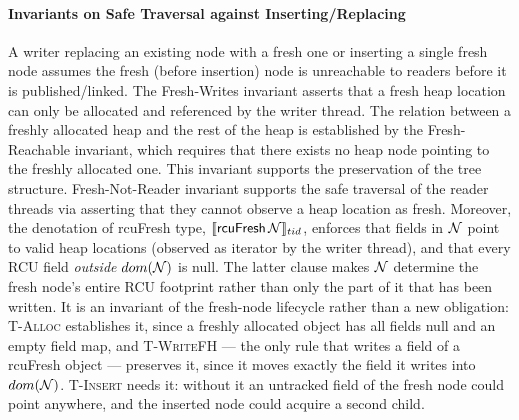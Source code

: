 \paragraph{Invariants on Safe Traversal against Inserting/Replacing} A writer {replacing an existing node with a fresh one} or {inserting a single fresh node} assumes the fresh (before insertion) node is unreachable to readers before it is published/linked.
The \textsf{Fresh-Writes} invariant asserts that a fresh heap location can only be allocated and referenced by the writer thread. The relation between a freshly allocated heap and the rest of the heap is established by the \textsf{Fresh-Reachable} invariant, which requires that there exists no heap node pointing to the freshly allocated one. This invariant supports the preservation of the tree structure. \textsf{Fresh-Not-Reader} invariant supports the safe traversal of the reader threads via asserting that they cannot observe a heap location as \textsf{fresh}. 
Moreover, the denotation of \textsf{rcuFresh} type, $\llbracket \mathsf{rcuFresh}\,\mathcal{N} \rrbracket_{tid}$, enforces that fields in $\mathcal{N}$ point to valid heap locations (observed as \textsf{iterator} by the writer thread), and that every \textsf{RCU} field \emph{outside} $dom(\mathcal{N})$ is \textsf{null}.  The latter clause makes $\mathcal{N}$ determine the fresh node's entire \textsf{RCU} footprint rather than only the part of it that has been written.  It is an invariant of the fresh-node lifecycle rather than a new obligation: \textsc{T-Alloc} establishes it, since a freshly allocated object has all fields \textsf{null} and an empty field map, and \textsc{T-WriteFH} --- the only rule that writes a field of a \textsf{rcuFresh} object --- preserves it, since it moves exactly the field it writes into $dom(\mathcal{N})$.  \textsc{T-Insert} needs it: without it an untracked field of the fresh node could point anywhere, and the inserted node could acquire a second child.
